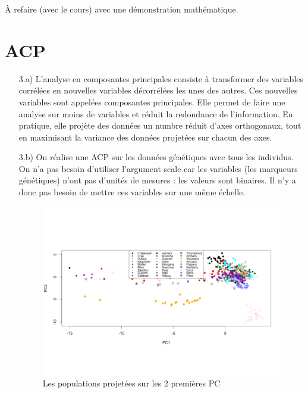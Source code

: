 \documentclass[a4paper, 12pt]{article}
\begin{document}
À refaire (avec le cours) avec une démonstration mathématique.

\section{ACP}
\begin{enumerate}
\setlength{\itemsep}{20pt}
\item[3.a)]
 L'analyse en composantes principales consiste à transformer des variables corrélées en nouvelles variables décorrélées les unes des autres. Ces nouvelles variables sont appelées composantes principales. Elle permet de faire une analyse sur moins de variables et réduit la redondance de l'information. En pratique, elle projète des données un numbre réduit d'axes orthogonaux, tout en maximisant la variance des données projetées sur chacun des axes.

 \item[3.b)]
 On réalise une ACP sur les données génétiques avec tous les individus. 
 On n'a pas besoin d'utiliser l'argument scale car les variables (les marqueurs génétiques) n'ont pas d'unités de mesures : les valeurs sont binaires. Il n'y a donc pas besoin de mettre ces variables sur une même échelle. 

\begin{figure}[!h]
\begin{center}
\includegraphics[scale=0.5]{Plot3b.pdf}
\caption{Les populations projetées sur les 2 premières PC}
\end{center}
\end{figure}


\end{enumerate}
\end{document}
